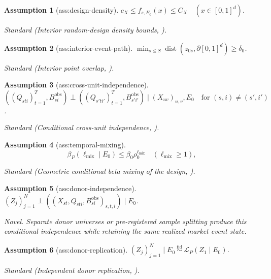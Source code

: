 \documentclass{article}
\newtheorem{assumption}{Assumption}
\begin{document}
\begin{assumption}[ass:design-density]\label{ass:design-density}
\(c_X\le f_{s,E_0}(x)\le C_X\quad(x\in[0,1]^d)\).
\par\smallskip\noindent\emph{Standard} (Interior random-design density bounds, \cite{Gaiffas2007}).
\end{assumption}

\begin{assumption}[ass:interior-event-path]\label{ass:interior-event-path}
\(\min_{s\le S}\operatorname{dist}(z_{0s},\partial[0,1]^d)\ge\delta_0\).
\par\smallskip\noindent\emph{Standard} (Interior point overlap, \cite{Gaiffas2007}).
\end{assumption}

\begin{assumption}[ass:cross-unit-independence]\label{ass:cross-unit-independence}
\(((Q_{sti})_{t=1}^{T},B_{si}^{\mathrm{obs}})\perp((Q_{s'ti'})_{t=1}^{T},B_{s'i'}^{\mathrm{obs}})\mid(X_{uv})_{u,v},E_0\quad\text{for }(s,i)\ne(s',i')\).
\par\smallskip\noindent\emph{Standard} (Conditional cross-unit independence, \cite{YanYao2023}).
\end{assumption}

\begin{assumption}[ass:temporal-mixing]\label{ass:temporal-mixing}
\[
\beta_P(\ell_{\mathrm{mix}}\mid E_0)
\le \beta_0\rho_0^{\ell_{\mathrm{mix}}}
\quad(\ell_{\mathrm{mix}}\ge1),
\]
\par\smallskip\noindent\emph{Standard} (Geometric conditional beta mixing of the design, \cite{CattaneoFengTitiunik2021}).
\end{assumption}

\begin{assumption}[ass:donor-independence]\label{ass:donor-independence}
\((Z_j)_{j=1}^{N}\perp((X_{st},Q_{sti},B_{si}^{\mathrm{obs}})_{s,t,i})\mid E_0\).
\par\smallskip\noindent\emph{Novel.} Separate donor universes or pre-registered sample splitting produce this conditional independence while retaining the same realized market event state.
\end{assumption}

\begin{assumption}[ass:donor-replication]\label{ass:donor-replication}
\((Z_j)_{j=1}^{N}\mid E_0\ \overset{\mathrm{iid}}{\sim}\ \mathcal L_P(Z_1\mid E_0)\).
\par\smallskip\noindent\emph{Standard} (Independent donor replication, \cite{DelaigleHallMeister2008}).
\end{assumption}
\end{document}
